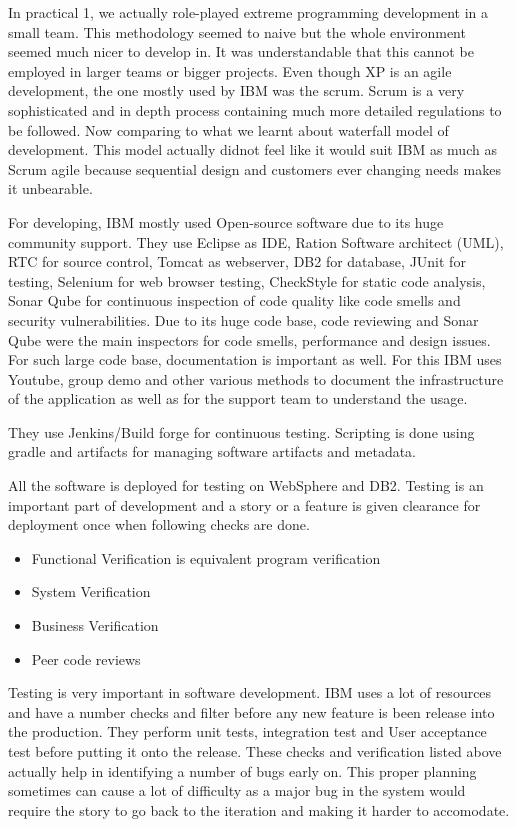 In practical 1, we actually role-played extreme programming development in a small team. This methodology seemed to naive but the whole environment seemed much nicer to develop in. It was understandable that this cannot be employed in larger teams or bigger projects. Even though XP is an agile development, the one mostly used by IBM was the scrum. Scrum is a very sophisticated and in depth process containing much more detailed regulations to be followed. Now comparing to what we learnt about waterfall model of development. This model actually didnot feel like it would suit IBM as much as Scrum agile because sequential design and customers ever changing needs makes it unbearable.

For developing, IBM mostly used Open-source software due to its huge community support. They use Eclipse as IDE, Ration Software architect (UML), RTC for source control, Tomcat as webserver, DB2 for database, JUnit for testing, Selenium for web browser testing, CheckStyle for static code analysis, Sonar Qube for continuous inspection of code quality like code smells and security vulnerabilities. Due to its huge code base, code reviewing and Sonar Qube were the main inspectors for code smells, performance and design issues. For such large code base, documentation is important as well. For this IBM uses Youtube, group demo and other various methods to document the infrastructure of the application as well as for the support team to understand the usage.

They use Jenkins/Build forge for continuous testing. Scripting is done using gradle and artifacts for managing software artifacts and metadata.

All the software is deployed for testing on WebSphere and DB2. Testing is an important part of development and a story or a feature is given clearance for deployment once when following checks are done.

\begin{itemize}
    \item Functional Verification is equivalent program verification
    \item System Verification
    \item Business Verification
    \item Peer code reviews
\end{itemize}

Testing is very important in software development. IBM uses a lot of resources and have a number checks and filter before any new feature is been release into the production. They perform unit tests, integration test and User acceptance test before putting it onto the release. These checks and verification listed above actually help in identifying a number of bugs early on. This proper planning sometimes can cause a lot of difficulty as a major bug in the system would require the story to go back to the iteration and making it harder to accomodate. 

